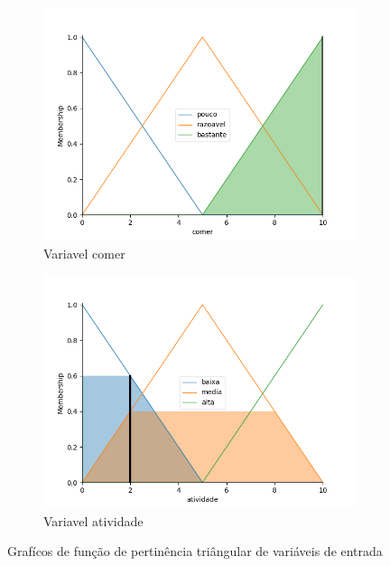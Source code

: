 \documentclass{article}
\begin{document}
\begin{figure}[h!]
  \centering
  \begin{subfigure}[b]{0.4\linewidth}
    \includegraphics[width=\linewidth]{./images/comer-alto.png}
    \caption{Variavel comer}
  \end{subfigure}
  \begin{subfigure}[b]{0.4\linewidth}
    \includegraphics[width=\linewidth]{./images/atividade-baixa.png}
    \caption{Variavel atividade}
  \end{subfigure}
  \caption{Grafícos de função de pertinência triângular de variáveis de entrada}
  \label{fig:triangular-2}
\end{figure}
\end{document}
